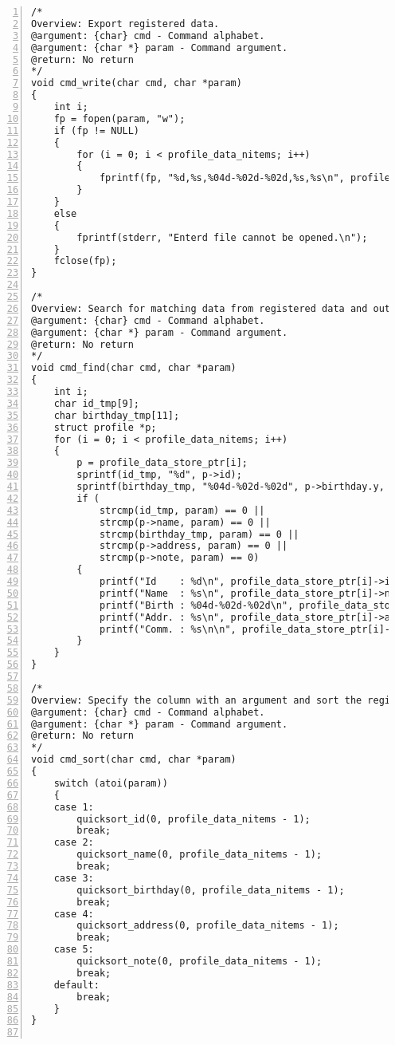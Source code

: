 \documentclass[autodetect-engine,dvi=dvipdfmx,ja=standard,
               a4j,11pt]{bxjsarticle}
\begin{document}
\begin{Verbatim}[numbers=left, xleftmargin=10mm, numbersep=6pt,
    fontsize=\small, baselinestretch=0.8]
/*
Overview: Export registered data.
@argument: {char} cmd - Command alphabet.
@argument: {char *} param - Command argument.
@return: No return
*/
void cmd_write(char cmd, char *param)
{
    int i;
    fp = fopen(param, "w");
    if (fp != NULL)
    {
        for (i = 0; i < profile_data_nitems; i++)
        {
            fprintf(fp, "%d,%s,%04d-%02d-%02d,%s,%s\n", profile_data_store_ptr[i]->id, profile_data_store_ptr[i]->name, profile_data_store_ptr[i]->birthday.y, profile_data_store_ptr[i]->birthday.m, profile_data_store_ptr[i]->birthday.d, profile_data_store_ptr[i]->address, profile_data_store_ptr[i]->note);
        }
    }
    else
    {
        fprintf(stderr, "Enterd file cannot be opened.\n");
    }
    fclose(fp);
}

/*
Overview: Search for matching data from registered data and output.
@argument: {char} cmd - Command alphabet.
@argument: {char *} param - Command argument.
@return: No return
*/
void cmd_find(char cmd, char *param)
{
    int i;
    char id_tmp[9];
    char birthday_tmp[11];
    struct profile *p;
    for (i = 0; i < profile_data_nitems; i++)
    {
        p = profile_data_store_ptr[i];
        sprintf(id_tmp, "%d", p->id);
        sprintf(birthday_tmp, "%04d-%02d-%02d", p->birthday.y, p->birthday.m, p->birthday.d);
        if (
            strcmp(id_tmp, param) == 0 ||
            strcmp(p->name, param) == 0 ||
            strcmp(birthday_tmp, param) == 0 ||
            strcmp(p->address, param) == 0 ||
            strcmp(p->note, param) == 0)
        {
            printf("Id    : %d\n", profile_data_store_ptr[i]->id);
            printf("Name  : %s\n", profile_data_store_ptr[i]->name);
            printf("Birth : %04d-%02d-%02d\n", profile_data_store_ptr[i]->birthday.y, profile_data_store_ptr[i]->birthday.m, profile_data_store_ptr[i]->birthday.d);
            printf("Addr. : %s\n", profile_data_store_ptr[i]->address);
            printf("Comm. : %s\n\n", profile_data_store_ptr[i]->note);
        }
    }
}

/*
Overview: Specify the column with an argument and sort the registered data.
@argument: {char} cmd - Command alphabet.
@argument: {char *} param - Command argument.
@return: No return
*/
void cmd_sort(char cmd, char *param)
{
    switch (atoi(param))
    {
    case 1:
        quicksort_id(0, profile_data_nitems - 1);
        break;
    case 2:
        quicksort_name(0, profile_data_nitems - 1);
        break;
    case 3:
        quicksort_birthday(0, profile_data_nitems - 1);
        break;
    case 4:
        quicksort_address(0, profile_data_nitems - 1);
        break;
    case 5:
        quicksort_note(0, profile_data_nitems - 1);
        break;
    default:
        break;
    }
}


\end{Verbatim}
\end{document}

